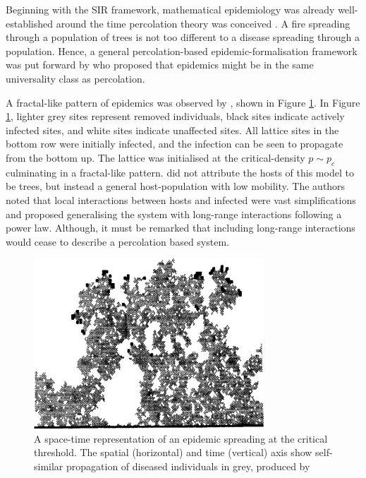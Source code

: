 Beginning with the SIR framework, mathematical epidemiology was already well-established
around the time percolation theory was conceived \cite{baily1975mathematical}. 
A fire spreading through a population of trees is not too different to a disease spreading through 
a population. Hence, a general percolation-based epidemic-formalisation framework was put forward by
\cite{pub.1059067807} who proposed that epidemics might be in the same universality class
as percolation.

A fractal-like pattern of epidemics was observed by \cite{GRASSBERGER1986273}, shown in Figure \ref{fig:1d_perc_basis}. 
In Figure \ref{fig:1d_perc_basis}, lighter grey sites represent removed individuals, 
black sites indicate actively infected sites, and white sites indicate unaffected sites. 
All lattice sites in the bottom row were initially infected, and the infection can be seen to propagate
from the bottom up. The lattice was initialised at the critical-density $p\sim p_c$ culminating in a fractal-like pattern.
\cite{GRASSBERGER1986273} did not attribute the hosts of this model to be trees, but instead a general host-population with low mobility. 
The authors noted that local interactions between hosts and infected were vast simplifications and proposed 
generalising the system with long-range interactions following a power law. 
Although, it must be remarked that including long-range interactions would cease to describe a percolation based system.

\begin{figure}
    \centering
    \includegraphics{chapter2/figures/perc1.jpg}
    \caption{A space-time representation of an epidemic spreading at the critical threshold. 
    The spatial (horizontal) and time (vertical) axis show self-similar propagation of diseased 
    individuals in grey, produced by \cite{GRASSBERGER1986273}}
    \label{fig:1d_perc_basis}
\end{figure}

